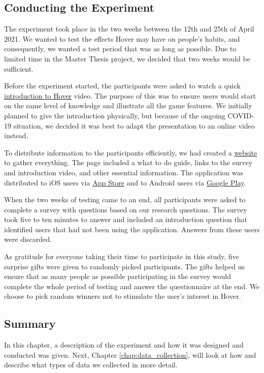 \subsection{Conducting the Experiment}
The experiment took place in the two weeks between the 12th and 25th of April 2021. We wanted to test the effects Hover may have on people’s habits, and consequently, we wanted a test period that was as long as possible. Due to limited time in the Master Thesis project, we decided that two weeks would be sufficient. 

Before the experiment started, the participants were asked to watch a quick \href{https://youtu.be/vx7aeTkt_aY}{introduction to Hover} video. The purpose of this was to ensure users would start on the same level of knowledge and illustrate all the game features. We initially planned to give the introduction physically, but because of the ongoing COVID-19 situation, we decided it was best to adapt the presentation to an online video instead.

To distribute information to the participants efficiently, we had created a \href{https://hover-game.web.app/testing/en}{website} to gather everything. The page included a what to do guide, links to the survey and introduction video, and other essential information. The application was distributed to iOS users via \href{https://apps.apple.com/no/app/hover/id1556425356}{App Store} and to Android users via \href{https://play.google.com/store/apps/details?id=com.hoverapp.hover}{Google Play}.

When the two weeks of testing came to an end, all participants were asked to complete a survey with questions based on our research questions. The survey took five to ten minutes to answer and included an introduction question that identified users that had not been using the application. Answers from these users were discarded.

As gratitude for everyone taking their time to participate in this study, five surprise gifts were given to randomly picked participants. The gifts helped us ensure that as many people as possible participating in the survey would complete the whole period of testing and answer the questionnaire at the end. We choose to pick random winners not to stimulate the user’s interest in Hover.

\subsection{Summary}
In this chapter, a description of the experiment and how it was designed and conducted was given. Next, Chapter \ref{chap:data_collection}, will look at how and describe what types of data we collected in more detail.
